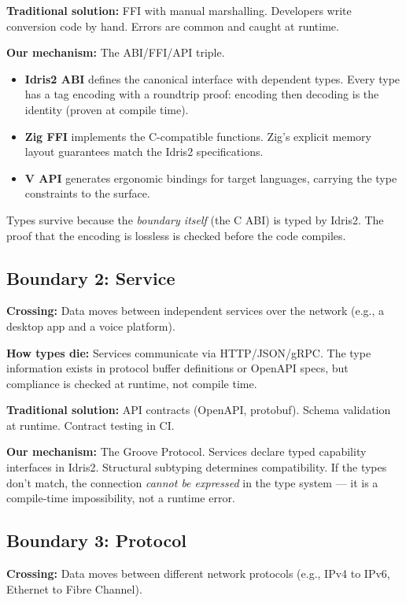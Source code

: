 \documentclass[11pt,a4paper]{article}
\begin{document}
\textbf{Traditional solution:} FFI with manual marshalling. Developers
write conversion code by hand. Errors are common and caught at runtime.

\textbf{Our mechanism:} The ABI/FFI/API triple.
\begin{itemize}
\item \textbf{Idris2 ABI} defines the canonical interface with dependent
  types. Every type has a tag encoding with a roundtrip proof: encoding
  then decoding is the identity (proven at compile time).
\item \textbf{Zig FFI} implements the C-compatible functions. Zig's
  explicit memory layout guarantees match the Idris2 specifications.
\item \textbf{V API} generates ergonomic bindings for target languages,
  carrying the type constraints to the surface.
\end{itemize}

Types survive because the \emph{boundary itself} (the C ABI) is typed
by Idris2. The proof that the encoding is lossless is checked before
the code compiles.

\subsection{Boundary 2: Service}

\textbf{Crossing:} Data moves between independent services over the
network (e.g., a desktop app and a voice platform).

\textbf{How types die:} Services communicate via HTTP/JSON/gRPC. The
type information exists in protocol buffer definitions or OpenAPI specs,
but compliance is checked at runtime, not compile time.

\textbf{Traditional solution:} API contracts (OpenAPI, protobuf).
Schema validation at runtime. Contract testing in CI.

\textbf{Our mechanism:} The Groove Protocol. Services declare typed
capability interfaces in Idris2. Structural subtyping determines
compatibility. If the types don't match, the connection \emph{cannot be
expressed} in the type system --- it is a compile-time impossibility,
not a runtime error.

\subsection{Boundary 3: Protocol}

\textbf{Crossing:} Data moves between different network protocols
(e.g., IPv4 to IPv6, Ethernet to Fibre Channel).
\end{document}
